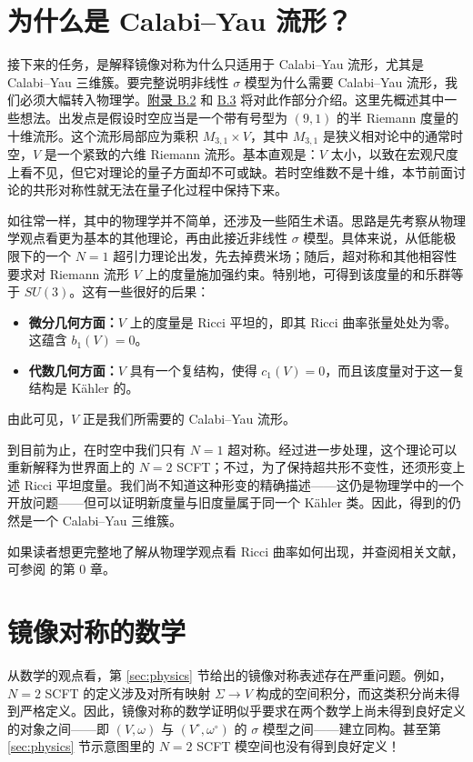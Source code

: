 \begingroup\linespread{1.22}\selectfont
\section{为什么是 Calabi--Yau 流形？}\label{sec:calabi-yau-physics}

接下来的任务，是解释镜像对称为什么只适用于 Calabi--Yau 流形，尤其是 Calabi--Yau 三维簇。要完整说明非线性 $\sigma$ 模型为什么需要 Calabi--Yau 流形，我们必须大幅转入物理学。\hyperref[sec:nonlinear-sigma-models]{附录 B.2} 和 \hyperref[sec:conformal-field-theories]{B.3} 将对此作部分介绍。这里先概述其中一些想法。出发点是假设时空应当是一个带有号型为 $(9,1)$ 的半 Riemann 度量的十维流形。这个流形局部应为乘积 $M_{3,1}\times V$，其中 $M_{3,1}$ 是狭义相对论中的通常时空，$V$ 是一个紧致的六维 Riemann 流形。基本直观是：$V$ 太小，以致在宏观尺度上看不见，但它对理论的量子方面却不可或缺。若时空维数不是十维，本节前面讨论的共形对称性就无法在量子化过程中保持下来。

如往常一样，其中的物理学并不简单，还涉及一些陌生术语。思路是先考察从物理学观点看更为基本的其他理论，再由此接近非线性 $\sigma$ 模型。具体来说，从低能极限下的一个 $N=1$ 超引力理论出发，先去掉费米场；随后，超对称和其他相容性要求对 Riemann 流形 $V$ 上的度量施加强约束。特别地，可得到该度量的和乐群等于 $SU(3)$。这有一些很好的后果：
\begin{itemize}
\item \textbf{微分几何方面：}$V$ 上的度量是 Ricci 平坦的，即其 Ricci 曲率张量处处为零。这蕴含 $b_1(V)=0$。
\item \textbf{代数几何方面：}$V$ 具有一个复结构，使得 $c_1(V)=0$，而且该度量对于这一复结构是 Kähler 的。
\end{itemize}
由此可见，$V$ 正是我们所需要的 Calabi--Yau 流形。

到目前为止，在时空中我们只有 $N=1$ 超对称。经过进一步处理，这个理论可以重新解释为世界面上的 $N=2$ SCFT；不过，为了保持超共形不变性，还须形变上述 Ricci 平坦度量。我们尚不知道这种形变的精确描述——这仍是物理学中的一个开放问题——但可以证明新度量与旧度量属于同一个 Kähler 类。因此，得到的仍然是一个 Calabi--Yau 三维簇。

如果读者想更完整地了解从物理学观点看 Ricci 曲率如何出现，并查阅相关文献，可参阅  的第 0 章。

\section{镜像对称的数学}\label{sec:math-preview}

从数学的观点看，第 \ref{sec:physics} 节给出的镜像对称表述存在严重问题。例如，$N=2$ SCFT 的定义涉及对所有映射 $\Sigma\to V$ 构成的空间积分，而这类积分尚未得到严格定义。因此，镜像对称的数学证明似乎要求在两个数学上尚未得到良好定义的对象之间——即 $(V,\omega)$ 与 $(V^\circ,\omega^\circ)$ 的 $\sigma$ 模型之间——建立同构。甚至第 \ref{sec:physics} 节示意图里的 $N=2$ SCFT 模空间也没有得到良好定义！

